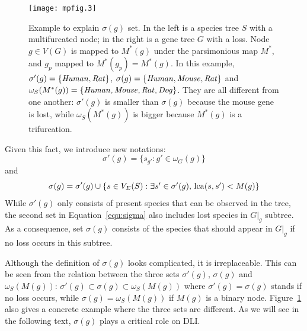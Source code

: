 \begin{figure}[!hb]
\begin{center}
\texttt{[image: mpfig.3]}
\end{center}
\caption[Example to explain $\sigma(g)$ set]{Example to explain $\sigma(g)$ set. In the left is a species tree $S$
with a multifurcated node; in the right is a gene tree $G$ with a loss. Node $g\in V(G)$
is mapped to $M^*(g)$ under the parsimonious map $M^*$, and $g_p$ mapped to $M^*(g_p)=M^*(g)$.
In this example,
$\sigma'(g)=\{{\it Human,Rat}\}$, $\sigma(g)=\{{\it Human,Mouse,Rat}\}$ and
$\omega_S(M^*(g))=\{{\it Human,Mouse,Rat,Dog}\}$. They are all different from one another:
$\sigma'(g)$ is smaller than $\sigma(g)$ because the mouse gene is lost,
while $\omega_S(M^*(g))$ is bigger because $M^*(g)$ is a trifurcation.}\label{fig:sigma}
\end{figure}

Given this fact, we introduce new notations:
\begin{equation}\label{equ:sigma0}
\sigma'(g)=\{s_{g'}:g'\in\omega_G(g)\}
\end{equation}
and
\begin{equation}\label{equ:sigma}
\sigma(g)=\sigma'(g)\cup\left\{s\in V_E(S):\mbox{$\exists s'\in\sigma'(g)$, $\mathrm{lca}(s,s')<M(g)$}\right\}
\end{equation}
While $\sigma'(g)$ only consists of present species that can be observed in the tree,
the second set in Equation~\ref{equ:sigma} also includes lost species in $G|_g$ subtree.
As a consequence, set $\sigma(g)$ consists of the species that should appear in $G|_g$ if no loss occurs in
this subtree.

Although the definition of $\sigma(g)$ looks complicated, it is irreplaceable.
This can be seen from the relation between the three sets $\sigma'(g)$, $\sigma(g)$ and $\omega_S(M(g))$:
$\sigma'(g)\subset\sigma(g)\subset\omega_S(M(g))$ where $\sigma'(g)=\sigma(g)$
stands if no loss occurs, while $\sigma(g)=\omega_S(M(g))$ if $M(g)$ is a binary node.
Figure~\ref{fig:sigma} also gives a concrete example where the three sets are different. As we will see in the following text,
$\sigma(g)$ plays a critical role on DLI.

